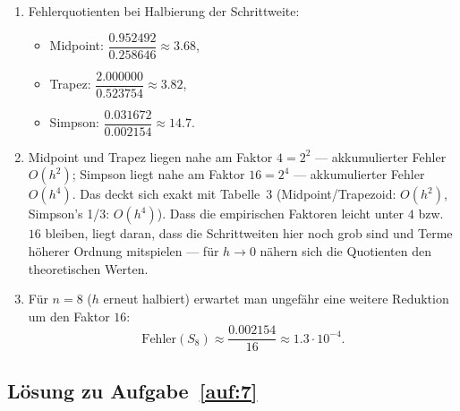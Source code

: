 \documentclass[a4paper,11pt]{scrartcl}
\begin{document}
\begin{enumerate}[label=(\alph*)]
  \item Fehlerquotienten bei Halbierung der Schrittweite:
  \begin{itemize}[nosep]
    \item Midpoint: $\dfrac{0.952492}{0.258646} \approx 3.68$,
    \item Trapez: $\dfrac{2.000000}{0.523754} \approx 3.82$,
    \item Simpson: $\dfrac{0.031672}{0.002154} \approx 14.7$.
  \end{itemize}
  \item Midpoint und Trapez liegen nahe am Faktor $4 = 2^2$ --- akkumulierter Fehler $O(h^2)$; Simpson liegt nahe am Faktor $16 = 2^4$ --- akkumulierter Fehler $O(h^4)$. Das deckt sich exakt mit Tabelle~3 (Midpoint/Trapezoid: $O(h^2)$, Simpson's 1/3: $O(h^4)$). Dass die empirischen Faktoren leicht unter $4$ bzw.\ $16$ bleiben, liegt daran, dass die Schrittweiten hier noch grob sind und Terme höherer Ordnung mitspielen --- für $h \to 0$ nähern sich die Quotienten den theoretischen Werten.
  \item Für $n = 8$ ($h$ erneut halbiert) erwartet man ungefähr eine weitere Reduktion um den Faktor $16$:
  \[ \text{Fehler}(S_8) \approx \frac{0.002154}{16} \approx 1.3 \cdot 10^{-4}. \]
\end{enumerate}

\subsection*{Lösung zu Aufgabe~\ref{auf:7}}
\end{document}
